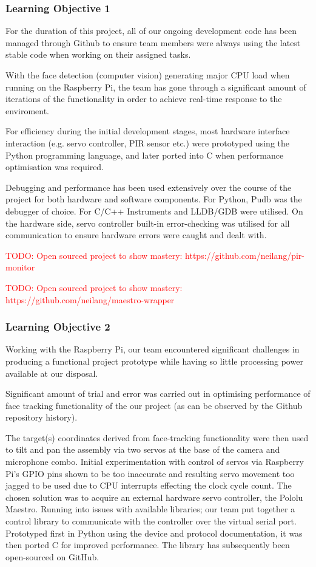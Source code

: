 \documentclass[11pt,a4paper,titlepage]{report}
\begin{document}
\subsubsection{Learning Objective 1}
For the duration of this project, all of our ongoing development code has been managed through Github to ensure team members were always using the latest stable code when working on their assigned tasks.

With the face detection (computer vision) generating major CPU load when running on the Raspberry Pi, the team has gone through a significant amount of iterations of the functionality in order to achieve real-time response to the enviroment.


For efficiency during the initial development stages, most hardware interface interaction (e.g. servo controller, PIR sensor etc.) were prototyped using the Python programming language, and later ported into C when performance optimisation was required.


Debugging and performance has been used extensively over the course of the project for both hardware and software components. For Python, Pudb was the debugger of choice. For C/C++ Instruments and LLDB/GDB were utilised. On the hardware side, servo controller built-in error-checking was utilised for all communication to ensure hardware errors were caught and dealt with.

\textcolor{red}{TODO: Open sourced project to show mastery: https://github.com/neilang/pir-monitor}

\textcolor{red}{TODO: Open sourced project to show mastery: https://github.com/neilang/maestro-wrapper}


 
\subsubsection{Learning Objective 2}

Working with the Raspberry Pi, our team encountered significant challenges in producing a functional project prototype while having so little processing power available at our disposal.

Significant amount of trial and error was carried out in optimising performance of face tracking functionality of the our project (as can be observed by the Github repository history). 

The target(s) coordinates derived from face-tracking functionality were then used to tilt and pan the assembly via two servos at the base of the camera and microphone combo. Initial experimentation with control of servos via Raspberry Pi's GPIO pins shown to be too inaccurate and resulting servo movement too jagged to be used due to CPU interrupts effecting the clock cycle count. The chosen solution was to acquire an external hardware servo controller, the Pololu Maestro. Running into issues with available libraries; our team put together a control library to communicate with the controller over the virtual  serial port. Prototyped first in Python using the device and protocol documentation, it was then ported C for improved performance. The library has subsequently been open-sourced on GitHub.
\end{document}
